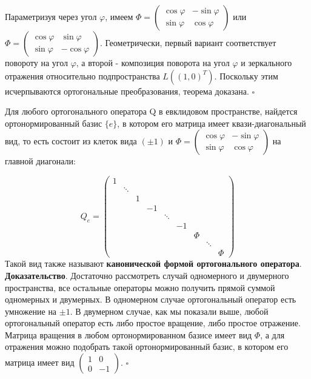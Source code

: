 		Параметризуя через угол $\varphi$, имеем $\Phi=\begin{pmatrix}
				\cos\varphi&-\sin\varphi\\\sin\varphi&\cos\varphi\end{pmatrix}$ 
		или $\Phi=\begin{pmatrix}\cos\varphi&\sin\varphi\\\sin\varphi&-
		\cos\varphi\end{pmatrix}$. Геометрически, первый вариант соответствует
		повороту на угол $\varphi$, а второй - композиция поворота на угол
		$\varphi$ и зеркального отражения относительно подпространства
		$L((1,0)^T)$. Поскольку этим исчерпываются ортогональные преобразования, 
		теорема доказана. $\square$
\begin{theor}
Для любого ортогонального оператора Q в евклидовом пространстве,
найдется ортонормированный базис $\{e\}$, в котором его матрица имеет 
квази-диагональный вид, то есть состоит из клеток вида $(\pm1)$ и
$\Phi=\begin{pmatrix}\cos\varphi&-\sin\varphi\\
\sin\varphi&\cos\varphi\end{pmatrix}$ на главной диагонали:
\end{theor}
$$Q_e=\begin{pmatrix}1&&&&&&&&\\
&\ddots&&&&&&&\\
&&1&&&&&&\\
&&&-1&&&&&\\
&&&&\ddots&&&&\\
&&&&&-1&&&\\
&&&&&&\Phi&&\\
&&&&&&&\ddots&\\
&&&&&&&&\Phi\end{pmatrix}$$
Такой вид также называют \textbf{канонической формой ортогонального 
оператора}.\\
\textbf{Доказательство}. Достаточно рассмотреть случай одномерного и 
		двумерного пространства, все остальные операторы можно получить
		прямой суммой одномерных и двумерных. В одномерном случае ортогональный
		оператор есть умножение на $\pm1$. В двумерном случае, как мы показали
		выше, любой ортогональный оператор есть либо простое вращение, либо
		простое отражение. Матрица вращения в любом ортонормированном базисе
		имеет вид $\Phi$, а для отражения можно подобрать такой 
		ортонормированный базис, в котором его матрица имеет вид
		$\begin{pmatrix}1&0\\0&-1\end{pmatrix}$.
$\square$\\


